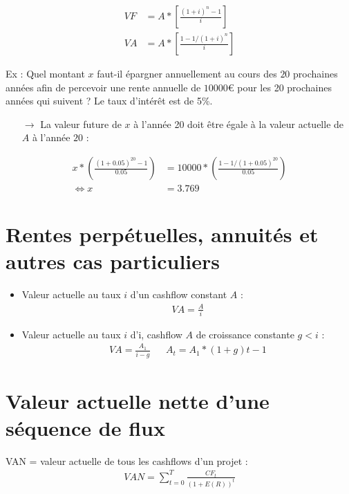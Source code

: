 \begin{align*}
    VF &= A * \left[ \frac{(1 + i)^n - 1}{i}         \right] \\
    VA &= A * \left[ \frac{1 - 1/(1+i)^n}{i} \right]
\end{align*}

Ex : Quel montant $x$ faut-il épargner annuellement au cours des $20$ prochaines années afin de percevoir une rente annuelle de $10000$€ pour les 20 prochaines années qui suivent ? Le taux d'intérêt est de 5\%.
\begin{itemize}
    \item[$\rightarrow$] La valeur future de $x$ à l'année 20 doit être égale à la valeur actuelle de $A$ à l'année $20$ :
\end{itemize}
\begin{align*}
    x * \left( \frac{(1 + 0.05)^{20} - 1}{0.05} \right) &= 10000 * \left( \frac{1 - 1/(1 + 0.05)^{20}}{0.05} \right) \\
    \Leftrightarrow x &= 3.769
\end{align*}

\section{Rentes perpétuelles, annuités et autres cas particuliers}

\begin{itemize}
    \item Valeur actuelle au taux $i$ d'un cashflow constant $A$ :
    \begin{align*}
        VA = \frac{A}{i}
    \end{align*}
    \item Valeur actuelle au taux $i$ d'i, cashflow $A$ de croissance constante $g < i$ :
    \begin{align*}
        VA = \frac{A_1}{i - g} && A_t = A_1 * (1 + g) t - 1
    \end{align*}
\end{itemize}

\section{Valeur actuelle nette d'une séquence de flux}

VAN = valeur actuelle de tous les cashflows d'un projet :
\begin{align*}
    VAN = \sum_{t = 0}^T \frac{CF_t}{(1 + E(R))^t}
\end{align*}

